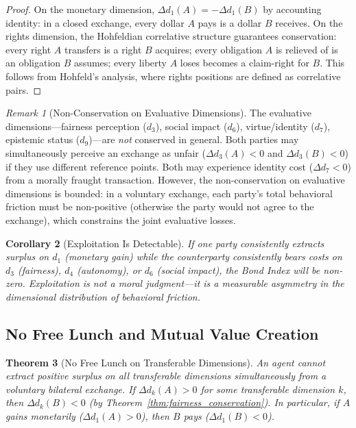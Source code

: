 \documentclass[12pt]{article}
\newtheorem{theorem}{Theorem}[section]
\newtheorem{corollary}[theorem]{Corollary}
\theoremstyle{definition}
\theoremstyle{remark}
\newtheorem{remark}[theorem]{Remark}
\begin{document}
\begin{proof}
On the monetary dimension, $\Delta d_1(A) = -\Delta d_1(B)$ by accounting identity: in a closed exchange, every dollar $A$ pays is a dollar $B$ receives.  On the rights dimension, the Hohfeldian correlative structure guarantees conservation: every right $A$ transfers is a right $B$ acquires; every obligation $A$ is relieved of is an obligation $B$ assumes; every liberty $A$ loses becomes a claim-right for $B$.  This follows from Hohfeld's \cite{hohfeld1913} analysis, where rights positions are defined as correlative pairs.
\end{proof}

\begin{remark}[Non-Conservation on Evaluative Dimensions]
The evaluative dimensions---fairness perception ($d_3$), social impact ($d_6$), virtue/identity ($d_7$), epistemic status ($d_9$)---are \emph{not} conserved in general.  Both parties may simultaneously perceive an exchange as unfair ($\Delta d_3(A) < 0$ and $\Delta d_3(B) < 0$) if they use different reference points.  Both may experience identity cost ($\Delta d_7 < 0$) from a morally fraught transaction.  However, the non-conservation on evaluative dimensions is bounded: in a voluntary exchange, each party's total behavioral friction must be non-positive (otherwise the party would not agree to the exchange), which constrains the joint evaluative losses.
\end{remark}

\begin{corollary}[Exploitation Is Detectable]
If one party consistently extracts surplus on $d_1$ (monetary gain) while the counterparty consistently bears costs on $d_3$ (fairness), $d_4$ (autonomy), or $d_6$ (social impact), the Bond Index will be non-zero.  Exploitation is not a moral judgment---it is a \emph{measurable asymmetry} in the dimensional distribution of behavioral friction.
\end{corollary}

\subsection{No Free Lunch and Mutual Value Creation}

\begin{theorem}[No Free Lunch on Transferable Dimensions]
\label{thm:no_free_lunch}
An agent cannot extract positive surplus on all \emph{transferable} dimensions simultaneously from a voluntary bilateral exchange.  If $\Delta d_k(A) > 0$ for some transferable dimension $k$, then $\Delta d_k(B) < 0$ (by Theorem~\ref{thm:fairness_conservation}).  In particular, if $A$ gains monetarily ($\Delta d_1(A) > 0$), then $B$ pays ($\Delta d_1(B) < 0$).
\end{theorem}
\end{document}
